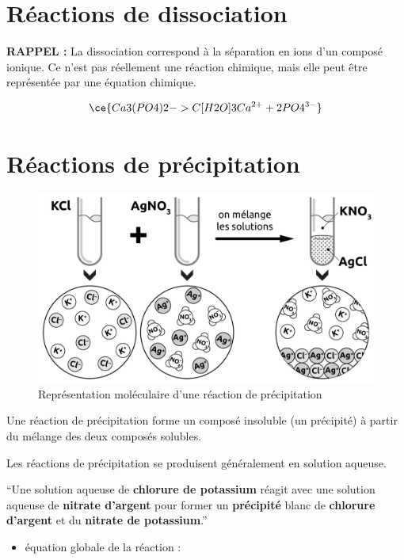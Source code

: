 \documentclass[
  11pt,
  a4paper,
  openany]{book}
\providecommand{\tightlist}{%
  \setlength{\itemsep}{0pt}\setlength{\parskip}{0pt}}
\begin{document}
\hypertarget{ruxe9actions-de-dissociation}{%
\section{Réactions de dissociation}\label{ruxe9actions-de-dissociation}}

\textbf{RAPPEL :} La dissociation correspond à la séparation en ions d'un composé ionique. Ce n'est pas réellement une réaction chimique, mais elle peut être représentée par une équation chimique.

\[ \ce{Ca3(PO4)2 ->C[H2O] 3Ca^{2+} + 2PO4^{3-}} \]

\hypertarget{ruxe9actions-de-pruxe9cipitation}{%
\section{Réactions de précipitation}\label{ruxe9actions-de-pruxe9cipitation}}

\begin{figure}

{\centering \includegraphics[width=0.5\linewidth]{images/precipitation-0} 

}

\caption{Représentation moléculaire d'une réaction de précipitation}\label{fig:precipitation-0}
\end{figure}

Une réaction de précipitation forme un composé insoluble (un précipité) à partir du mélange des deux composés solubles.

Les réactions de précipitation se produisent généralement en solution aqueuse.

``Une solution aqueuse de \textbf{chlorure de potassium} réagit avec une solution aqueuse de \textbf{nitrate d'argent} pour former un \textbf{précipité} blanc de \textbf{chlorure d'argent} et du \textbf{nitrate de potassium}.''

\begin{itemize}
\tightlist
\item
  équation globale de la réaction :
\end{itemize}
\end{document}
